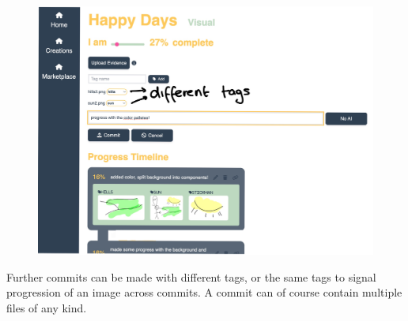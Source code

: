 \documentclass[12pt,a4paper]{article}
\begin{document}
\begin{figure}[H]
    \centering
    \includegraphics[scale=0.24]{tagging2.png}
\end{figure}
\noindent Further commits can be made with different tags, or the same tags to signal progression of an image across commits. A commit can of course contain multiple files of any kind. 
\end{document}
